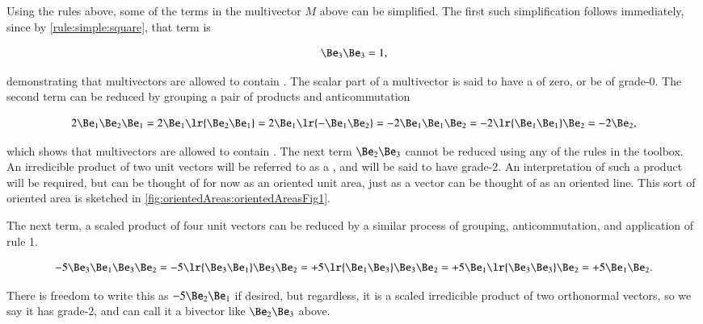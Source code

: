 Using the rules above, some of the terms in the multivector \( M \) above can be simplified.  The first such simplification follows immediately, since by \ref{rule:simple:square}, that term is

\begin{equation}\label{eqn:SimpleProducts:40}
\Be_3 \Be_3 = 1,
\end{equation}

demonstrating that multivectors are allowed to contain .  The scalar part of a multivector is said to have a  of zero, or be of grade-0.  The second term can be reduced by grouping a pair of products and anticommutation

\begin{dmath}\label{eqn:SimpleProducts:60}
2 \Be_1 \Be_2 \Be_1
=
2 \Be_1 \lr{ \Be_2 \Be_1 }
=
2 \Be_1 \lr{ - \Be_1 \Be_2 }
=
-2 \Be_1 \Be_1 \Be_2
=
-2 \lr{ \Be_1 \Be_1 } \Be_2
=
-2 \Be_2,
\end{dmath}

which shows that multivectors are allowed to contain .
The next term \( \Be_2 \Be_3 \) cannot be reduced using any of the rules in the toolbox.  An irredicible product of two unit vectors will be referred to as a , and will be said to have grade-2.  An interpretation of such a product will be required, but can be thought of for now as an oriented unit area, just as a vector can be thought of as an oriented line.  This sort of oriented area is sketched in
\cref{fig:orientedAreas:orientedAreasFig1}.


The next term, a scaled product of four unit vectors can be reduced by a similar process of grouping, anticommutation, and application of rule 1.

\begin{dmath}\label{eqn:SimpleProducts:80}
- 5 \Be_3 \Be_1 \Be_3 \Be_2
=
- 5 \lr{ \Be_3 \Be_1 } \Be_3 \Be_2
=
+ 5 \lr{ \Be_1 \Be_3 } \Be_3 \Be_2
=
+ 5 \Be_1 \lr{ \Be_3 \Be_3 } \Be_2
=
+ 5 \Be_1 \Be_2.
\end{dmath}

There is freedom to write this as \( - 5 \Be_2 \Be_1 \) if desired, but regardless, it is a
scaled irredicible product of two orthonormal vectors, so we say it has grade-2, and can call it a bivector like \( \Be_2 \Be_3 \) above.

